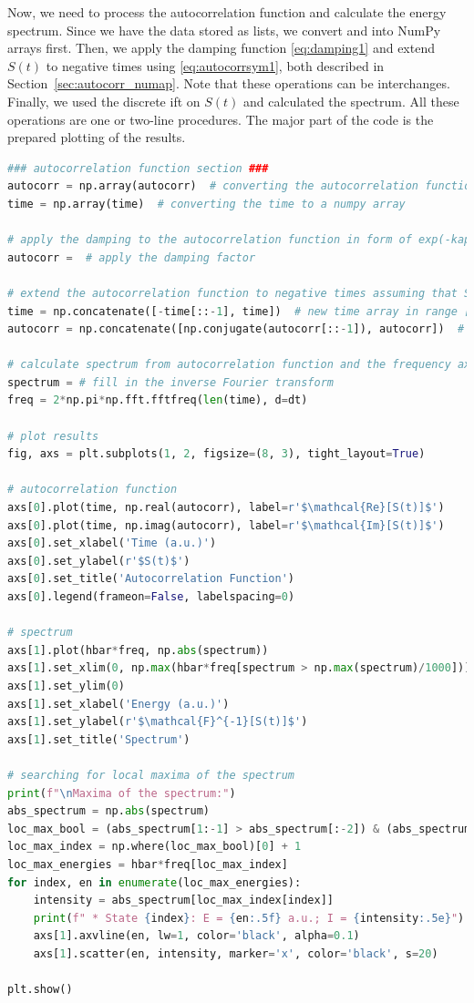 Now, we need to process the autocorrelation function and calculate the energy spectrum. Since we have the data stored as lists, we convert  and  into NumPy arrays first. Then, we apply the damping function \eqref{eq:damping1} and extend $S(t)$ to negative times using \eqref{eq:autocorrsym1}, both described in Section~\ref{sec:autocorr_numap}. Note that these operations can be interchanges. Finally, we used the discrete \acrshort{ift} on $S(t)$ and calculated the spectrum. All these operations are one or two-line procedures. The major part of the code is the prepared plotting of the results.
\begin{lstlisting}[language=Python, style=mystyle2]
### autocorrelation function section ###
autocorr = np.array(autocorr)  # converting the autocorrelation function to a numpy array
time = np.array(time)  # converting the time to a numpy array

# apply the damping to the autocorrelation function in form of exp(-kappa*time)
autocorr =  # apply the damping factor

# extend the autocorrelation function to negative times assuming that S(t) = S^*(-t)
time = np.concatenate([-time[::-1], time])  # new time array in range [-t_max, t_max]
autocorr = np.concatenate([np.conjugate(autocorr[::-1]), autocorr])  # new symmetric autocorr in range [-t_max, t_max]

# calculate spectrum from autocorrelation function and the frequency axis corresponding to it
spectrum = # fill in the inverse Fourier transform
freq = 2*np.pi*np.fft.fftfreq(len(time), d=dt)

# plot results
fig, axs = plt.subplots(1, 2, figsize=(8, 3), tight_layout=True)

# autocorrelation function
axs[0].plot(time, np.real(autocorr), label=r'$\mathcal{Re}[S(t)]$')
axs[0].plot(time, np.imag(autocorr), label=r'$\mathcal{Im}[S(t)]$')
axs[0].set_xlabel('Time (a.u.)')
axs[0].set_ylabel(r'$S(t)$')
axs[0].set_title('Autocorrelation Function')
axs[0].legend(frameon=False, labelspacing=0)

# spectrum
axs[1].plot(hbar*freq, np.abs(spectrum))
axs[1].set_xlim(0, np.max(hbar*freq[spectrum > np.max(spectrum)/1000]))
axs[1].set_ylim(0)
axs[1].set_xlabel('Energy (a.u.)')
axs[1].set_ylabel(r'$\mathcal{F}^{-1}[S(t)]$')
axs[1].set_title('Spectrum')

# searching for local maxima of the spectrum
print(f"\nMaxima of the spectrum:")
abs_spectrum = np.abs(spectrum)
loc_max_bool = (abs_spectrum[1:-1] > abs_spectrum[:-2]) & (abs_spectrum[1:-1] > abs_spectrum[2:])
loc_max_index = np.where(loc_max_bool)[0] + 1
loc_max_energies = hbar*freq[loc_max_index]
for index, en in enumerate(loc_max_energies):
    intensity = abs_spectrum[loc_max_index[index]]
    print(f" * State {index}: E = {en:.5f} a.u.; I = {intensity:.5e}")
    axs[1].axvline(en, lw=1, color='black', alpha=0.1)
    axs[1].scatter(en, intensity, marker='x', color='black', s=20)

plt.show()
\end{lstlisting}

